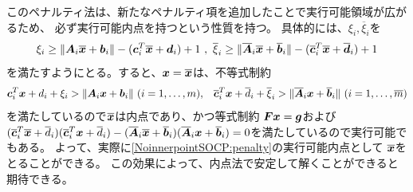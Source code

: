 \documentclass[11pt,a4paper,dvipdfmx,titlepage,uplatex]{jsarticle}
\theoremstyle{mystyle}
\newcommand{\0}{\mathbf{0}}
\def\b{\mbox{\boldmath $b$}}
\def\c{\mbox{\boldmath $c$}}
\def\d{\mbox{\boldmath $d$}}
\def\g{\mbox{\boldmath $g$}}
\def\x{\mbox{\boldmath $x$}}
\def\A{\mbox{\boldmath $A$}}
\def\F{\mbox{\boldmath $F$}}
\begin{document}
このペナルティ法は、新たなペナルティ項を追加したことで実行可能領域が広がるため、
必ず実行可能内点を持つという性質を持つ。
具体的には、$\xi_i , \overline{\xi}_i$を
\begin{align}
  \xi_i \ge \|\A_i \overline{\x} + \b_i \| - (\c_i^T \overline{\x} + \d_i) + 1 \ , \
	\overline{\xi}_i \ge \|\overline{\A}_i \overline{\x} + \overline{\b}_i \| - (\overline{\c}_i^T \overline{\x} + \overline{\d}_i) + 1
\end{align}
を満たすようにとる。すると、$\x = \overline{\x}$は、不等式制約
\begin{align}
  \c_i^T \x + d_i+\xi_i > \|\A_i \x + \b_i\|
  \ (i=1, \ldots, m) ,
  & & \overline{\c}_i^T \x + \overline{d}_i + \overline{\xi}_i > \| \overline{\A}_i \x + \overline{\b}_i\|
  \ (i=1, \ldots, \overline{m})
\end{align}
を満たしているので$\overline{\x}$は内点であり、かつ等式制約
$\F \x = \g$および$(\overline{\c}_i^T \overline{\x} + \overline{d}_i)(\overline{\c}_i^T \x + \overline{d}_i)
-
(\overline{\A}_i \overline{\x} + \overline{\b}_i)(\overline{\A}_i \x + \overline{\b}_i) = 0$を満たしているので実行可能でもある。
よって、実際に\eqref{NoinnerpointSOCP:penalty}の実行可能内点として
$\overline{\x}$をとることができる。
この効果によって、内点法で安定して解くことができると期待できる。
\end{document}
